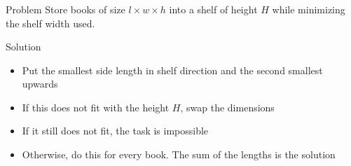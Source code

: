 \begin{frame}
  \frametitle{\problemtitle}
  \begin{block}{Problem}
    Store books of size $l \times w \times h$ into a shelf of height $H$ while minimizing the shelf width used.
  \end{block}

  \pause{}
  \hfill

  \begin{block}{Solution}
    \begin{itemize}
    \item Put the smallest side length in shelf direction and
      the second smallest upwards \pause{}
    \item If this does not fit with the height $H$, swap the dimensions \pause{}
    \item<4-> If it still does not fit, the task is impossible \pause{}
    \item<4-> Otherwise, do this for every book. The sum of the lengths is the solution
    \end{itemize}
  \end{block}
\end{frame}
